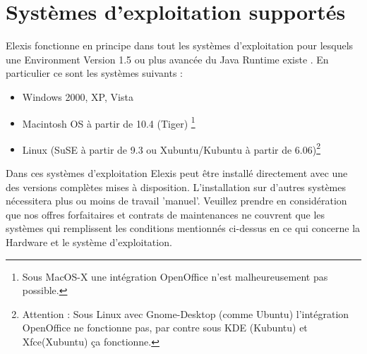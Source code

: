 \section{Systèmes d'exploitation supportés}
Elexis fonctionne en principe dans tout les systèmes d'exploitation pour lesquels une Environment Version 1.5 ou plus avancée du Java Runtime existe . En particulier ce sont les systèmes suivants :
\begin{itemize}
\item  Windows 2000, XP, Vista
\item  Macintosh OS à partir de 10.4 (Tiger)  \footnote{Sous MacOS-X une intégration OpenOffice n'est malheureusement pas possible.}
\item Linux (SuSE à partir de 9.3 ou Xubuntu/Kubuntu à partir de 6.06)\footnote{Attention : Sous Linux avec Gnome-Desktop (comme Ubuntu) l'intégration OpenOffice ne fonctionne pas, par contre sous KDE (Kubuntu) et Xfce(Xubuntu) ça fonctionne. }
\end{itemize}
Dans ces systèmes d'exploitation Elexis peut être installé directement avec une des versions complètes mises à disposition. L'installation sur d'autres systèmes nécessitera plus ou moins de travail 'manuel'. Veuillez prendre en considération que nos offres forfaitaires et contrats de maintenances ne couvrent que les systèmes qui remplissent les conditions mentionnés ci-dessus en ce qui concerne la Hardware et le système d'exploitation. 